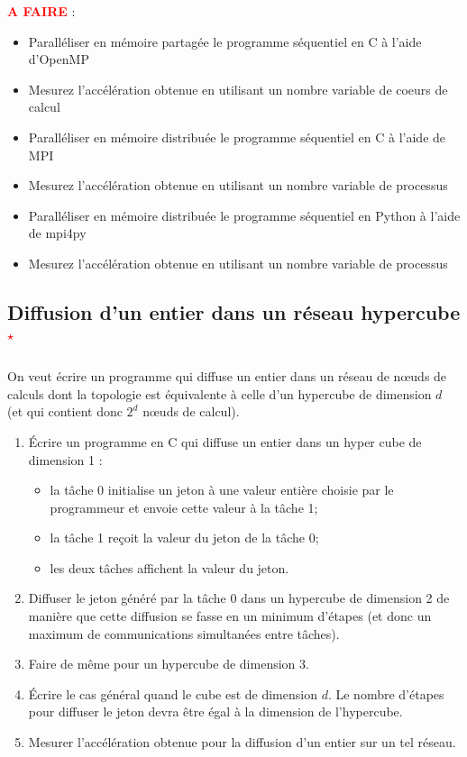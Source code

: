 \documentclass[11pt,a4paper]{article}
\begin{document}

\pagebreak
\textbf{\textcolor{red}{A FAIRE}} : 
\begin{itemize}
\item Paralléliser en mémoire partagée le programme séquentiel en C à l'aide d'OpenMP
\item Mesurez l'accélération obtenue en utilisant un nombre variable de coeurs de calcul
\item Paralléliser en mémoire distribuée le programme séquentiel en C à l'aide de MPI 
\item Mesurez l'accélération obtenue en utilisant un nombre variable de processus
\item Paralléliser en mémoire distribuée le programme séquentiel en Python à l'aide de mpi4py
\item Mesurez l'accélération obtenue en utilisant un nombre variable de processus
\end{itemize}

\subsection{Diffusion d'un entier dans un réseau hypercube\textcolor{red}{$^{\star}$}}

On veut écrire un programme qui diffuse un entier dans un réseau de n{\oe}uds de calculs dont la topologie
est équivalente à celle d'un hypercube de dimension $d$ (et qui contient donc $2^{d}$ n{\oe}uds de calcul).

\begin{enumerate}
\item \'Ecrire un programme en C qui diffuse un entier dans un hyper cube de dimension 1 :
\begin{itemize}
\item la tâche 0 initialise un jeton à une valeur entière choisie par le programmeur et envoie cette valeur 
à la tâche 1; 
\item la tâche 1 reçoit la valeur du jeton de la tâche 0;
\item les deux tâches affichent la valeur du jeton.
\end{itemize}
\item Diffuser le jeton généré par la tâche 0 dans un hypercube de dimension 2 de manière que cette diffusion se fasse en un minimum
d'étapes (et donc un maximum de communications simultanées entre tâches).
\item Faire de même pour un hypercube de dimension 3.
\item \'Ecrire le cas général quand le cube est de dimension $d$. Le nombre d'étapes pour diffuser le jeton devra
être égal à la dimension de l'hypercube.
\item Mesurer l'accélération obtenue pour la diffusion d'un entier sur un tel réseau.
\end{enumerate}
\end{document}
